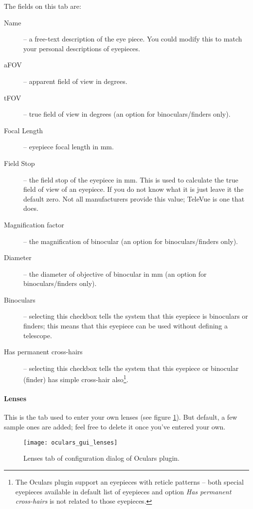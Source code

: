 The fields on this tab are:
\begin{description}
\item[Name] -- a free-text description of the eye piece. You could modify this to match your personal descriptions of eyepieces.
\item[aFOV] -- apparent field of view in degrees.
\item[tFOV] -- true field of view in degrees (an option for binoculars/finders only).
\item[Focal Length] -- eyepiece focal length in mm.
\item[Field Stop] -- the field stop of the eyepiece in mm. This is used to calculate the true field of view of an eyepiece. If you do not know what it is just leave it the default zero. Not all manufacturers provide this value; TeleVue is one that does.
\item[Magnification factor] -- the magnification of binocular (an option for binoculars/finders only).
\item[Diameter] -- the diameter of objective of binocular in mm (an option for binoculars/finders only).
\item[Binoculars] -- selecting this checkbox tells the system that this eyepiece is binoculars or finders; this means that this eyepiece can be used without defining a telescope.
\item[Has permanent cross-hairs] -- selecting this checkbox tells the system that this eyepiece or binocular (finder) has simple cross-hair also\footnote{The Oculars plugin support an eyepieces with reticle patterns -- both special eyepieces available in default list of eyepieces and option \emph{Has permanent cross-hairs} is not related to those eyepieces.}.
\end{description}

\paragraph{Lenses}

This is the tab used to enter your own lenses (see figure \ref{fig:plugins:Oculars:Gui:Lenses}). But default, a few sample ones are added; feel free to delete it once you've entered your own.

\begin{figure}[ht]\centering
\texttt{[image: oculars\_gui\_lenses]}
\caption{Lenses tab of configuration dialog of Oculars plugin.}
\label{fig:plugins:Oculars:Gui:Lenses}
\end{figure}

